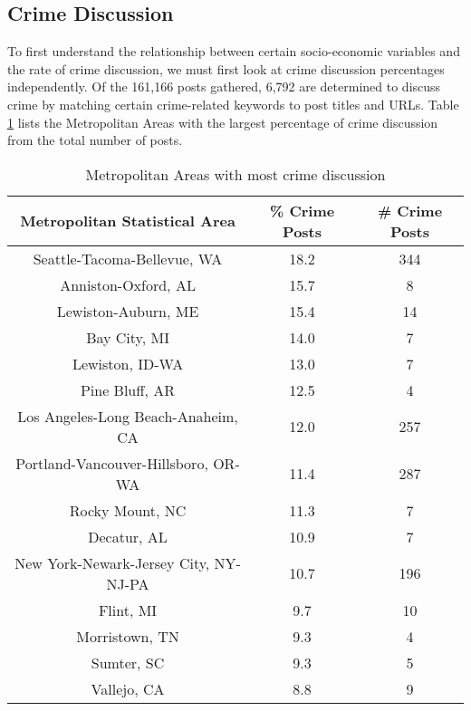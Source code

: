 \documentclass[12pt,oneside, letterpaper]{book}
\begin{document}
\subsection{Crime Discussion}

\par To first understand the relationship between certain socio-economic variables and the rate of crime discussion, we must first look at crime discussion percentages independently. Of the 161,166 posts gathered, 6,792 are determined to discuss crime by matching certain crime-related keywords to post titles and URLs. Table \ref{table:table-3} lists the Metropolitan Areas with the largest percentage of crime discussion from the total number of posts.

\begin{table}[h!]
    \centering
    \small
    \caption{Metropolitan Areas with most crime discussion}
    \begin{tabular}{| c | c | c |}
    \hline
    Metropolitan Statistical Area & \% Crime Posts & \# Crime Posts \\ \hline
    Seattle-Tacoma-Bellevue, WA & 18.2 & 344 \\ \hline
    Anniston-Oxford, AL & 15.7 & 8 \\ \hline
    Lewiston-Auburn, ME & 15.4 & 14 \\ \hline
    Bay City, MI & 14.0 & 7 \\ \hline
    Lewiston, ID-WA & 13.0 & 7 \\ \hline
    Pine Bluff, AR & 12.5 & 4 \\ \hline
    Los Angeles-Long Beach-Anaheim, CA & 12.0 & 257 \\ \hline
    Portland-Vancouver-Hillsboro, OR-WA & 11.4 & 287 \\ \hline
    Rocky Mount, NC & 11.3 & 7 \\ \hline
    Decatur, AL & 10.9 & 7 \\ \hline
    New York-Newark-Jersey City, NY-NJ-PA & 10.7 & 196 \\ \hline
    Flint, MI & 9.7 & 10 \\ \hline
    Morristown, TN & 9.3 & 4 \\ \hline
    Sumter, SC & 9.3 & 5 \\ \hline
    Vallejo, CA & 8.8 & 9 \\ \hline
	\end{tabular}
	\label{table:table-3}
\end{table}
\end{document}
